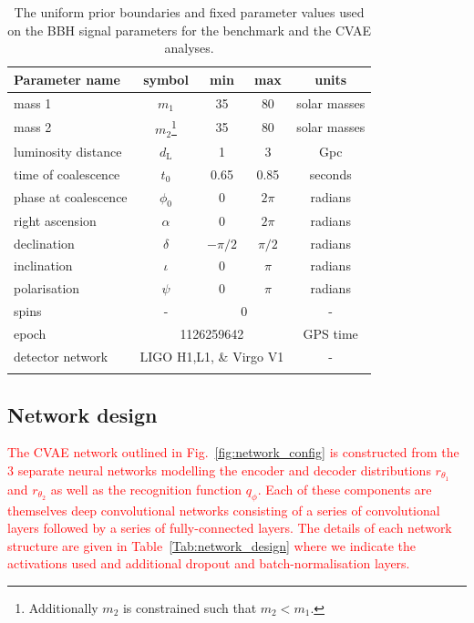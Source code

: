 \documentclass[%
showpacs,
nofootinbib,
 amsmath,amssymb,
 aps,
 twocolumn,
 prl,
 reprint,
floatfix,
]{revtex4-1}
\newcommand{\new}[1]{\textcolor{red}{#1}}
\begin{document}
%
%
\begin{table}
\centering
\caption{The uniform prior boundaries and fixed parameter values used on the \ac{BBH} signal parameters for the benchmark
and the \ac{CVAE} analyses.}
\begin{tabular}[t]{lcccc}
\toprule
Parameter name & symbol & min & max & units \\
\hline
mass 1 & $m_1$ & 35 & 80 & solar masses \\
mass 2 & $m_2$\footnote{Additionally $m_2$ is constrained such that
$m_{2}<m_{1}$.} & 35 & 80 & solar masses \\
luminosity distance & $d_{\text{L}}$ & 1 & 3 & Gpc \\
time of coalescence & $t_{0}$ & 0.65 & 0.85 & seconds \\
phase at coalescence & $\phi_{0}$ & 0 & $2\pi$ & radians \\
right ascension & $\alpha$ & 0 & $2\pi$ & radians \\
declination & $\delta$ & $-\pi/2$ & $\pi/2$ & radians \\
inclination & $\iota$ & 0 & $\pi$ & radians \\
polarisation & $\psi$ & 0 & $\pi$ & radians \\
\hline
spins & - & \multicolumn{2}{c}{0} & - \\
epoch & \multicolumn{3}{c}{1126259642} & GPS time \\
detector network & \multicolumn{3}{c}{LIGO H1,L1, \& Virgo V1} & - \\
\botrule
\end{tabular}
\label{tab:prior_ranges}
\end{table}

\subsection{Network design}\label{sec:network_design}
%
%

%
%
\new{The \ac{CVAE} network outlined in Fig.~\ref{fig:network_config} is constructed from
the 3 separate neural networks modelling the encoder and decoder distributions
$r_{\theta_1}$ and $r_{\theta_2}$ as well as the recognition function
$q_{\phi}$. Each of these components are themselves deep convolutional networks
consisting of a series of convolutional layers followed by a series of
fully-connected layers. The details of each network structure are given in
Table~\ref{Tab:network_design} where we indicate the activations used and additional
dropout and batch-normalisation layers.}
\end{document}
